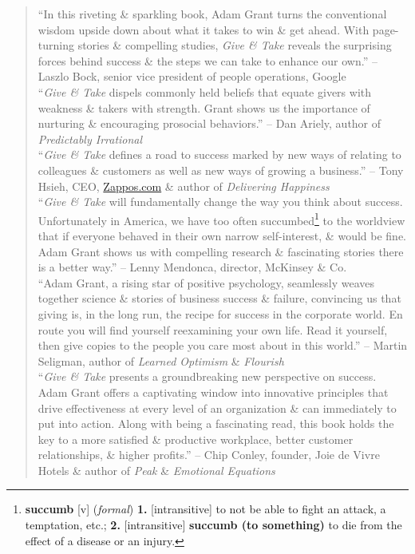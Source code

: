 \documentclass[oneside]{book}
\numberwithin{equation}{section}
\begin{document}
\begin{quotation}
	``In this riveting \& sparkling book, Adam Grant turns the conventional wisdom upside down about what it takes to win \& get ahead. With page-turning stories \& compelling studies, \textit{Give \& Take} reveals the surprising forces behind success \& the steps we can take to enhance our own.'' -- Laszlo Bock, senior vice president of people operations, Google\\
	
	``\textit{Give \& Take} dispels commonly held beliefs that equate givers with weakness \& takers with strength. Grant shows us the importance of nurturing \& encouraging prosocial behaviors.'' -- Dan Ariely, author of \textit{Predictably Irrational}\\
	
	``\textit{Give \& Take} defines a road to success marked by new ways of relating to colleagues \& customers as well as new ways of growing a business.'' -- Tony Hsieh, CEO, \url{Zappos.com} \& author of \textit{Delivering Happiness}\\
	
	``\textit{Give \& Take} will fundamentally change the way you think about success. Unfortunately in America, we have too often succumbed\footnote{\textbf{succumb} [v] (\textit{formal}) \textbf{1.} [intransitive] to not be able to fight an attack, a temptation, etc.; \textbf{2.} [intransitive] \textbf{succumb (to something)} to die from the effect of a disease or an injury.} to the worldview that if everyone behaved in their own narrow self-interest, \& would be fine. Adam Grant shows us with compelling research \& fascinating stories there is a better way.'' -- Lenny Mendonca, director, McKinsey \& Co.\\
	
	``Adam Grant, a rising star of positive psychology, seamlessly weaves together science \& stories of business success \& failure, convincing us that giving is, in the long run, the recipe for success in the corporate world. En route you will find yourself reexamining your own life. Read it yourself, then give copies to the people you care most about in this world.'' -- Martin Seligman, author of \textit{Learned Optimism} \& \textit{Flourish}\\
	
	``\textit{Give \& Take} presents a groundbreaking new perspective on success. Adam Grant offers a captivating window into innovative principles that drive effectiveness at every level of an organization \& can immediately to put into action. Along with being a fascinating read, this book holds the key to a more satisfied \& productive workplace, better customer relationships, \& higher profits.'' -- Chip Conley, founder, Joie de Vivre Hotels \& author of \textit{Peak} \& \textit{Emotional Equations}\\
	

\end{quotation}
\end{document}
